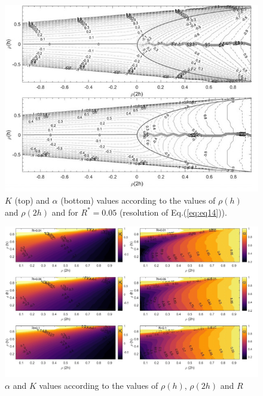 \begin{figure}
\includegraphics[scale=1.05]{fig1.jpg}%
\caption{$K$ (top) and $\alpha$ (bottom) values according to the values of $\rho(h)$ and $\rho(2h)$ and for $R^*=0.05$ (resolution of Eq.(\ref{eq:eq14})).} 
\label{fig:fig1} 
\end{figure}

\begin{landscape}
\begin{figure}[tb]
\includegraphics[scale=0.80]{fig2.jpg}%
\caption{$\alpha$ and $K$ values according to the values of $\rho(h)$, $\rho(2h)$ and $R$} 
\label{fig:fig2}
\end{figure}
\end{landscape}

